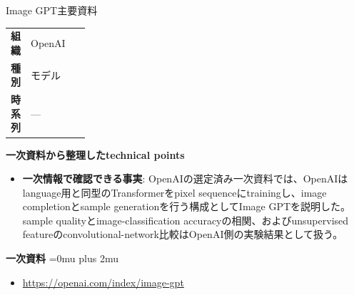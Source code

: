 \begin{technicalnote}{Image GPT}{主要資料}
\begingroup
\begin{tabularx}{\linewidth}{@{}>{\bfseries}p{0.22\linewidth}X@{}}
組織 & OpenAI \\
種別 & モデル \\
時系列 & — \\
\end{tabularx}
\smallskip
{\bfseries 一次資料から整理したtechnical points}
\begin{itemize}[leftmargin=1.5em,itemsep=0.35em]
\item \textbf{一次情報で確認できる事実}: OpenAIの選定済み一次資料では、OpenAIはlanguage用と同型のTransformerをpixel sequenceにtrainingし、image completionとsample generationを行う構成としてImage GPTを説明した。 sample qualityとimage-classification accuracyの相関、およびunsupervised featureのconvolutional-network比較はOpenAI側の実験結果として扱う。
\end{itemize}
\begin{minipage}{\linewidth}
\begin{samepage}
{\bfseries 一次資料}
\begingroup\sloppy
\Urlmuskip=0mu plus 2mu\relax
\begin{itemize}[leftmargin=1.5em,itemsep=0.25em]
\item {\scriptsize\url{https://openai.com/index/image-gpt}}
\end{itemize}
\endgroup
\end{samepage}
\end{minipage}
\endgroup
\end{technicalnote}
\medskip

